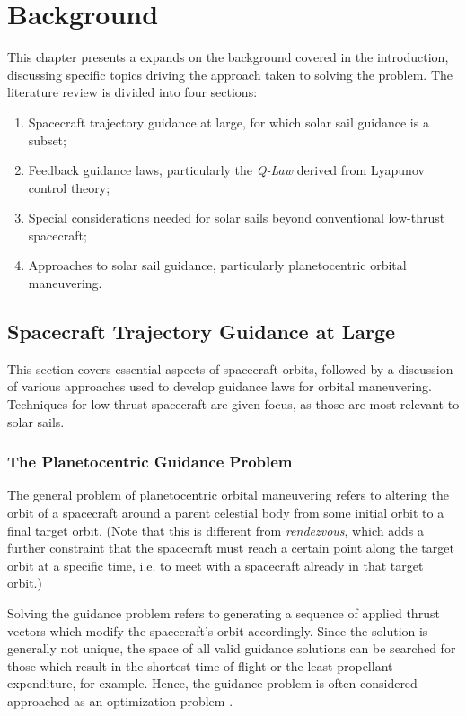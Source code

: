 \chapter{Background}
This chapter presents a expands on the background covered in the introduction, discussing specific topics driving the approach taken to solving the problem. The literature review is divided into four sections:
\begin{enumerate}
    \item Spacecraft trajectory guidance at large, for which solar sail guidance is a subset;
    \item Feedback guidance laws, particularly the \textit{Q-Law} derived from Lyapunov control theory;
    \item Special considerations needed for solar sails beyond conventional low-thrust spacecraft;
    \item Approaches to solar sail guidance, particularly planetocentric orbital maneuvering.
\end{enumerate}

\section{Spacecraft Trajectory Guidance at Large}

This section covers essential aspects of spacecraft orbits, followed by a discussion of various approaches used to develop guidance laws for orbital maneuvering. Techniques for low-thrust spacecraft are given focus, as those are most relevant to solar sails.

\subsection{The Planetocentric Guidance Problem}
The general problem of planetocentric orbital maneuvering refers to altering the orbit of a spacecraft around a parent celestial body from some initial orbit to a final target orbit. (Note that this is different from \textit{rendezvous}, which adds a further constraint that the spacecraft must reach a certain point along the target orbit at a specific time, i.e. to meet with a spacecraft already in that target orbit.)



Solving the guidance problem refers to generating a sequence of applied thrust vectors which modify the spacecraft's orbit accordingly. Since the solution is generally not unique, the space of all valid guidance solutions can be searched for those which result in the shortest time of flight or the least propellant expenditure, for example. Hence, the guidance problem is often considered approached as an optimization problem \cite{yam2011low}.

